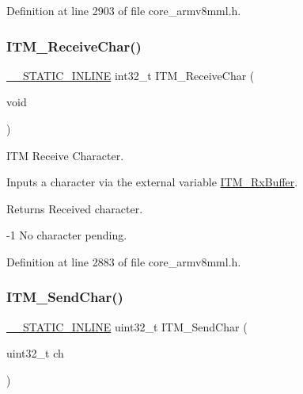 Definition at line 2903 of file core\+\_\+armv8mml.\+h.

\mbox{\label{group___c_m_s_i_s__core___debug_functions_gac3ee2c30a1ac4ed34c8a866a17decd53}} 
\subsubsection{\texorpdfstring{I\+T\+M\+\_\+\+Receive\+Char()}{ITM\_ReceiveChar()}}
{\footnotesize\ttfamily \hyperlink{cmsis__iccarm_8h_aba87361bfad2ae52cfe2f40c1a1dbf9c}{\+\_\+\+\_\+\+S\+T\+A\+T\+I\+C\+\_\+\+I\+N\+L\+I\+NE} int32\+\_\+t I\+T\+M\+\_\+\+Receive\+Char (\begin{DoxyParamCaption}\item[{void}]{ }\end{DoxyParamCaption})}



I\+TM Receive Character. 

Inputs a character via the external variable \hyperlink{group___c_m_s_i_s__core___debug_functions_ga12e68e55a7badc271b948d6c7230b2a8}{I\+T\+M\+\_\+\+Rx\+Buffer}. \begin{DoxyReturn}{Returns}
Received character. 

-\/1 No character pending. 
\end{DoxyReturn}


Definition at line 2883 of file core\+\_\+armv8mml.\+h.

\mbox{\label{group___c_m_s_i_s__core___debug_functions_gac90a497bd64286b84552c2c553d3419e}} 
\subsubsection{\texorpdfstring{I\+T\+M\+\_\+\+Send\+Char()}{ITM\_SendChar()}}
{\footnotesize\ttfamily \hyperlink{cmsis__iccarm_8h_aba87361bfad2ae52cfe2f40c1a1dbf9c}{\+\_\+\+\_\+\+S\+T\+A\+T\+I\+C\+\_\+\+I\+N\+L\+I\+NE} uint32\+\_\+t I\+T\+M\+\_\+\+Send\+Char (\begin{DoxyParamCaption}\item[{uint32\+\_\+t}]{ch }\end{DoxyParamCaption})}



